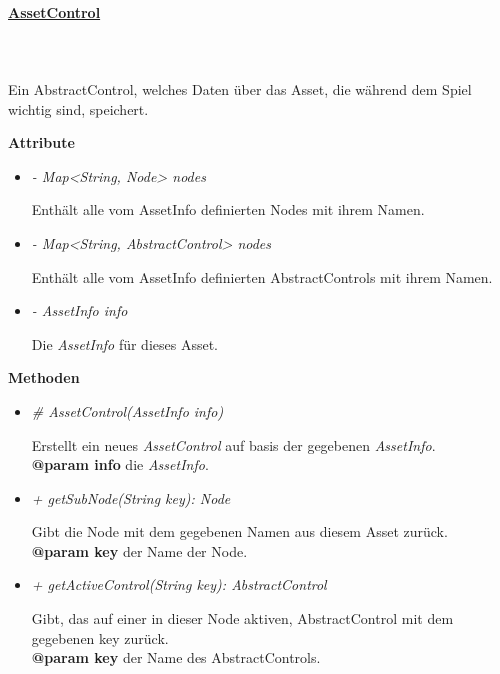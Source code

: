     \paragraph{\underline{AssetControl}} \mbox{}\\
    \\
        Ein AbstractControl, welches Daten über das Asset, die während dem Spiel wichtig sind, speichert.\par
    
        \textbf{Attribute}
        \begin{itemize}
            \item \textit{- Map<String, Node> nodes}
                \begin{leftbar}[0.9\linewidth]
                    Enthält alle vom AssetInfo definierten Nodes mit ihrem Namen.
                \end{leftbar}
            \item \textit{- Map<String, AbstractControl> nodes}
                \begin{leftbar}[0.9\linewidth]
                    Enthält alle vom AssetInfo definierten AbstractControls mit ihrem Namen.
                \end{leftbar}
            \item \textit{- AssetInfo info}
                \begin{leftbar}[0.9\linewidth]
                    Die \textit{AssetInfo} für dieses Asset.
                \end{leftbar}
        \end{itemize}
        \textbf{Methoden}
        \begin{itemize}
            \item \textit{\# AssetControl(AssetInfo info)}
                \begin{leftbar}[0.9\linewidth]
                   Erstellt ein neues \textit{AssetControl} auf basis der gegebenen \textit{AssetInfo}.\\
                   \textbf{@param info} die \textit{AssetInfo}.
                \end{leftbar}
            \item \textit{+ getSubNode(String key): Node}
                \begin{leftbar}[0.9\linewidth]
                   Gibt die Node mit dem gegebenen Namen aus diesem Asset zurück.\\
                   \textbf{@param key} der Name der Node.
                \end{leftbar}
            \item \textit{+ getActiveControl(String key): AbstractControl}
                \begin{leftbar}[0.9\linewidth]
                   Gibt, das auf einer in dieser Node aktiven, AbstractControl mit dem gegebenen key zurück.\\
                   \textbf{@param key} der Name des AbstractControls.
                \end{leftbar}
        \end{itemize}

